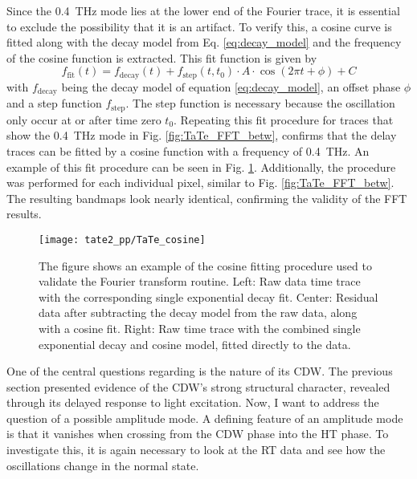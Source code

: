 Since the \qty{0.4}{\tera\hertz} mode lies at the lower end of the Fourier trace, it is essential to exclude the possibility that it is an artifact.
To verify this, a cosine curve is fitted along with the decay model from Eq. \ref{eq:decay_model} and the frequency of the cosine function is extracted. 
This fit function is given by
\begin{equation}
	f_\text{fit}(t) = f_\text{decay}(t) + f_\text{step}(t, t_0) \cdot A \cdot \cos(2\pi t+\phi) + C
\end{equation}
with $f_\text{decay}$ being the decay model of equation \ref{eq:decay_model}, an offset phase $\phi$ and a step function $f_\text{step}$.
The step function is necessary because the oscillation only occur at or after time zero $t_0$.
Repeating this fit procedure for traces that show the \qty{0.4}{\tera\hertz} mode in Fig. \ref{fig:TaTe_FFT_betw}, confirms that the delay traces can be fitted by a cosine function with a frequency of \qty{0.4}{\tera\hertz}.
An example of this fit procedure can be seen in Fig. \ref{fig:TaTe_cosine}.
Additionally, the procedure was performed for each individual pixel, similar to Fig. \ref{fig:TaTe_FFT_betw}.
The resulting bandmaps look nearly identical, confirming the validity of the FFT results.

\begin{figure}[t]
	\centering
	\texttt{[image: tate2\_pp/TaTe\_cosine]}
	\caption{The figure shows an example of the cosine fitting procedure used to validate the Fourier transform routine. Left: Raw data time trace with the corresponding single exponential decay fit. Center: Residual data after subtracting the decay model from the raw data, along with a cosine fit. Right: Raw time trace with the combined single exponential decay and cosine model, fitted directly to the data.}
	\label{fig:TaTe_cosine}
\end{figure}

One of the central questions regarding  is the nature of its CDW.
The previous section presented evidence of the CDW's strong structural character, revealed through its delayed response to light excitation.
Now, I want to address the question of a possible amplitude mode.
A defining feature of an amplitude mode is that it vanishes when crossing from the CDW phase into the HT phase.
To investigate this, it is again necessary to look at the RT data and see how the oscillations change in the normal state.

